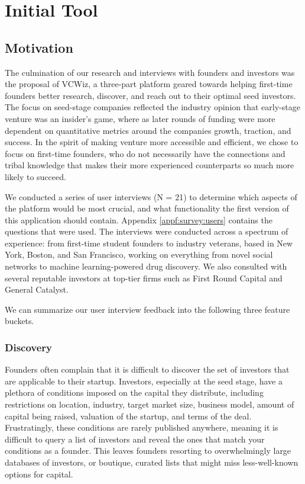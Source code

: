 \chapter{Initial Tool}
\label{ch:ch3}

\section{Motivation}

The culmination of our research and interviews with founders and investors was the proposal of VCWiz, a three-part platform geared towards helping first-time founders better research, discover, and reach out to their optimal seed investors. The focus on seed-stage companies reflected the industry opinion that early-stage venture was an insider's game, where as later rounds of funding were more dependent on quantitative metrics around the companies growth, traction, and success. In the spirit of making venture more accessible and efficient, we chose to focus on first-time founders, who do not necessarily have the connections and tribal knowledge that makes their more experienced counterparts so much more likely to succeed.

We conducted a series of user interviews (N = 21) to determine which aspects of the platform would be most crucial, and what functionality the first version of this application should contain. Appendix \ref{appf:survey:users} contains the questions that were used. The interviews were conducted across a spectrum of experience: from first-time student founders to industry veterans, based in New York, Boston, and San Francisco, working on everything from novel social networks to machine learning-powered drug discovery. We also consulted with several reputable investors at top-tier firms such as First Round Capital and General Catalyst.

We can summarize our user interview feedback into the following three feature buckets.

\subsection{Discovery}

Founders often complain that it is difficult to discover the set of investors that are applicable to their startup. Investors, especially at the seed stage, have a plethora of conditions imposed on the capital they distribute, including restrictions on location, industry, target market size, business model, amount of capital being raised, valuation of the startup, and terms of the deal. Frustratingly, these conditions are rarely published anywhere, meaning it is difficult to query a list of investors and reveal the ones that match your conditions as a founder. This leaves founders resorting to overwhelmingly large databases of investors, or boutique, curated lists that might miss less-well-known options for capital.

